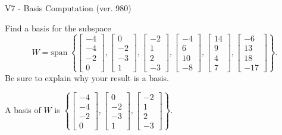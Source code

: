 \begin{exercise}
  \begin{exerciseTitle}V7 - Basis Computation (ver. 980)\end{exerciseTitle}
  \begin{exerciseStatement}
    Find a basis for the subspace 
\[W=\mathrm{span}\ \left\{\left[\begin{array}{r}
-4 \\
-4 \\
-2 \\
0
\end{array}\right] , \left[\begin{array}{r}
0 \\
-2 \\
-3 \\
1
\end{array}\right] , \left[\begin{array}{r}
-2 \\
1 \\
2 \\
-3
\end{array}\right] , \left[\begin{array}{r}
-4 \\
6 \\
10 \\
-8
\end{array}\right] , \left[\begin{array}{r}
14 \\
9 \\
4 \\
7
\end{array}\right] , \left[\begin{array}{r}
-6 \\
13 \\
18 \\
-17
\end{array}\right]\right\}.\]
 Be sure to explain why your result is a basis.


  \end{exerciseStatement}
  \begin{exerciseAnswer}
   A basis of \(W\) is  \(\left\{\left[\begin{array}{r}
-4 \\
-4 \\
-2 \\
0
\end{array}\right] , \left[\begin{array}{r}
0 \\
-2 \\
-3 \\
1
\end{array}\right] , \left[\begin{array}{r}
-2 \\
1 \\
2 \\
-3
\end{array}\right]\right\}\).
  


  \end{exerciseAnswer}
\end{exercise}